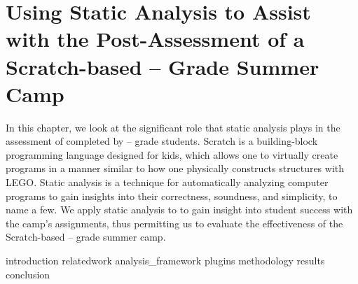 \chapter{Using Static Analysis to Assist with the Post-Assessment of a
  Scratch-based -- Grade Summer Camp}
\label{chap:hairball}

\def\currentprefix{hairball}

In this chapter, we look at the significant role that static analysis plays in
the assessment of  completed by -- grade
students. Scratch is a building-block programming language designed for kids,
which allows one to virtually create programs in a manner similar to how one
physically constructs structures with LEGO\textregistered{}. Static analysis is
a technique for automatically analyzing computer programs to gain insights into
their correctness, soundness, and simplicity, to name a few. We apply static
analysis to  to gain insight into student success with the camp's
assignments, thus permitting us to evaluate the effectiveness of the
Scratch-based -- grade summer camp.

{introduction}
{relatedwork}
{analysis_framework}
{plugins}
{methodology}
{results}
{conclusion}
